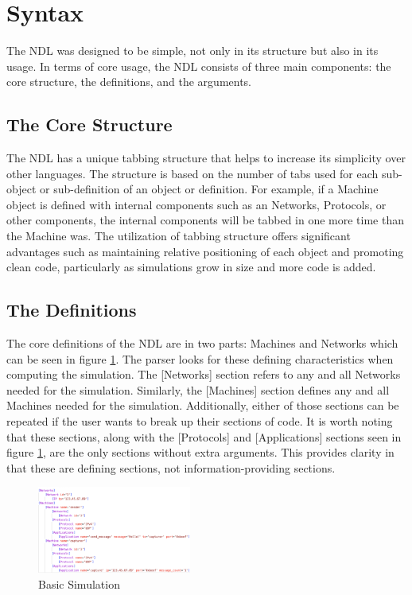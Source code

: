 \documentclass[journal]{IEEEtran} %
\newcommand{\imagewidth}{0.45\textwidth}
\begin{document}
\section{Syntax}
The NDL was designed to be simple, not only in its structure but also in its usage. In terms of core usage, the NDL consists of three main components: the core structure, the definitions, and the arguments.
\subsection{The Core Structure}
The NDL has a unique tabbing structure that helps to increase its simplicity over other languages. The structure is based on the number of tabs used for each sub-object or sub-definition of an object or definition. For example, if a Machine object is defined with internal components such as an Networks, Protocols, or other components, the internal components will be tabbed in one more time than the Machine was. The utilization of tabbing structure offers significant advantages such as maintaining relative positioning of each object and promoting clean code, particularly as simulations grow in size and more code is added.

\subsection{The Definitions}
The core definitions of the NDL are in two parts: Machines and Networks which can be seen in figure \ref{fig:basicsim}. The parser looks for these defining characteristics when computing the simulation. The [Networks] section refers to any and all Networks needed for the simulation. Similarly, the [Machines] section defines any and all Machines needed for the simulation. Additionally, either of those sections can be repeated if the user wants to break up their sections of code. It is worth noting that these sections, along with the [Protocols] and [Applications] sections seen in figure \ref{fig:basicsim}, are the only sections without extra arguments. This provides clarity in that these are defining sections, not information-providing sections.

\begin{figure}[H]
    \centerline{\includegraphics[width=\imagewidth]{Images/fig1.png}}
    \caption{Basic Simulation}
    \label{fig:basicsim}
\end{figure}
\end{document}
